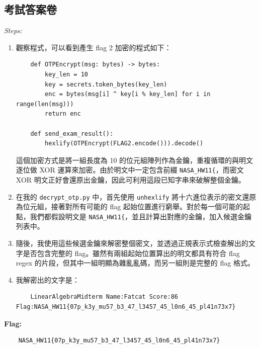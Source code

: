 \documentclass[12pt]{article}
\newenvironment{mycolorbox}[1][gray]{
  \renewmdenv[
    linewidth=2pt, linecolor=#1, backgroundcolor=#1!10,
    topline=false, bottomline=false, rightline=false,
    skipabove=10pt, skipbelow=10pt, innerleftmargin=10pt,
    innerrightmargin=0pt, innertopmargin=5pt, innerbottommargin=5pt
  ]{myquote}
  \begin{myquote}
}{\end{myquote}}
\begin{document}
\subsection{考試答案卷}
\textit{Steps:}
\begin{enumerate}
  \item 觀察程式，可以看到產生 flag 2 加密的程式如下：
  \small
  \begin{verbatim}
    def OTPEncrypt(msg: bytes) -> bytes:
        key_len = 10
        key = secrets.token_bytes(key_len)
        enc = bytes(msg[i] ^ key[i % key_len] for i in range(len(msg)))
        return enc

    def send_exam_result():
        hexlify(OTPEncrypt(FLAG2.encode())).decode()
  \end{verbatim}
  \normalsize
  這個加密方式是將一組長度為 10 的位元組陣列作為金鑰，重複循環的與明文逐位做 XOR 運算來加密。由於明文中一定包含前綴 \texttt{NASA\_HW11\{}，而密文 XOR 明文正好會還原出金鑰，因此可利用這段已知字串來破解整個金鑰。
  \item 在我的 \texttt{decrypt\_otp.py} 中，首先使用 \texttt{unhexlify} 將十六進位表示的密文還原為位元組，接著對所有可能的 flag 起始位置進行窮舉。對於每一個可能的起點，我們都假設明文是 \texttt{NASA\_HW11\{}，並且計算出對應的金鑰，加入候選金鑰列表中。
  \item 隨後，我使用這些候選金鑰來解密整個密文，並透過正規表示式檢查解出的文字是否包含完整的 flag。雖然有兩組起始位置算出的明文都具有符合 flag regex 的片段，但其中一組明顯為雜亂亂碼，而另一組則是完整的 flag 格式。
  \item 我解密出的文字是：
  \small
  \begin{verbatim}
    LinearAlgebraMidterm Name:Fatcat Score:86 Flag:NASA_HW11{07p_k3y_mu57_b3_47_l3457_45_l0n6_45_pl41n73x7}
  \end{verbatim}
  \normalsize
\end{enumerate}
\begin{mycolorbox}[green]
  \textbf{Flag:} 
  \begin{verbatim}
    NASA_HW11{07p_k3y_mu57_b3_47_l3457_45_l0n6_45_pl41n73x7}
  \end{verbatim}
\end{mycolorbox}
\end{document}
